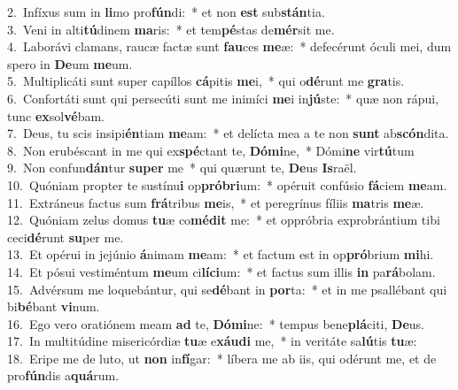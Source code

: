 {2.~}Infíxus sum in \textbf{li}mo pro\textbf{fún}di:~* et non \textbf{est} sub\textbf{stán}tia.\\
{3.~}Veni in alti\textbf{tú}dinem \textbf{ma}ris:~* et tem\textbf{pé}stas de\textbf{mér}sit me.\\
{4.~}Laborávi clamans, raucæ factæ sunt \textbf{fau}ces \textbf{me}æ:~* defecérunt óculi mei, dum spero in \textbf{De}um \textbf{me}um.\\
{5.~}Multiplicáti sunt super capíllos \textbf{cá}pitis \textbf{me}i,~* qui o\textbf{dé}runt me \textbf{gra}tis.\\
{6.~}Confortáti sunt qui persecúti sunt me inimíci \textbf{me}i in\textbf{jú}ste:~* quæ non rápui, tunc \textbf{ex}sol\textbf{vé}bam.\\
{7.~}Deus, tu scis insipi\textbf{én}tiam \textbf{me}am:~* et delícta mea a te non \textbf{sunt} ab\textbf{scón}dita.\\
{8.~}Non erubéscant in me qui ex\textbf{spé}ctant te, \textbf{Dó}\textbf{mi}ne,~* Dómi\textbf{ne} vir\textbf{tú}tum\\
{9.~}Non confun\textbf{dán}tur \textbf{su}\textbf{per} me~* qui quærunt te, \textbf{De}us \textbf{Is}raël.\\
{10.~}Quóniam propter te sustínu\textbf{i} op\textbf{pró}\textbf{bri}um:~* opéruit confúsio \textbf{fá}ciem \textbf{me}am.\\
{11.~}Extráneus factus sum \textbf{frá}tribus \textbf{me}is,~* et peregrínus fíliis \textbf{ma}tris \textbf{me}æ.\\
{12.~}Quóniam zelus domus \textbf{tu}æ co\textbf{mé}\textbf{dit} me:~* et oppróbria exprobrántium tibi ceci\textbf{dé}runt \textbf{su}per me.\\
{13.~}Et opérui in jejúnio \textbf{á}nimam \textbf{me}am:~* et factum est in op\textbf{pró}brium \textbf{mi}hi.\\
{14.~}Et pósui vestiméntum \textbf{me}um ci\textbf{lí}\textbf{ci}um:~* et factus sum illis \textbf{in} pa\textbf{rá}bolam.\\
{15.~}Advérsum me loquebántur, qui se\textbf{dé}bant in \textbf{por}ta:~* et in me psallébant qui bi\textbf{bé}bant \textbf{vi}num.\\
{16.~}Ego vero oratiónem meam \textbf{ad} te, \textbf{Dó}\textbf{mi}ne:~* tempus bene\textbf{plá}citi, \textbf{De}us.\\
{17.~}In multitúdine misericórdiæ \textbf{tu}æ e\textbf{xáu}\textbf{di} me,~* in veritáte sa\textbf{lú}tis \textbf{tu}æ:\\
{18.~}Eripe me de luto, ut \textbf{non} in\textbf{fí}gar:~* líbera me ab iis, qui odérunt me, et de pro\textbf{fún}dis a\textbf{quá}rum.\\
